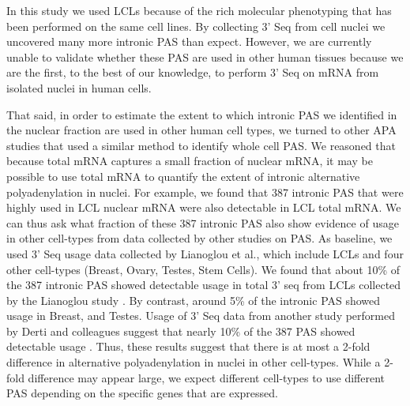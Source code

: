 In this study we used LCLs because of the rich molecular phenotyping that has been performed on the same cell lines. By collecting 3' Seq from cell nuclei we uncovered many more intronic PAS than expect. However, we are currently unable to validate whether these PAS are used in other human tissues because we are the first, to the best of our knowledge, to perform 3' Seq on mRNA from isolated nuclei in human cells.

That said, in order to estimate the extent to which intronic PAS we identified in the nuclear fraction are used in other human cell types, we turned to other APA studies that used a similar method to identify whole cell PAS. We reasoned that because total mRNA captures a small fraction of nuclear mRNA, it may be possible to use total mRNA to quantify the extent of intronic alternative polyadenylation in nuclei. For example, we found that 387 intronic PAS that were highly used in LCL nuclear mRNA were also detectable in LCL total mRNA. We can thus ask what fraction of these 387 intronic PAS also show evidence of usage in other cell-types from data collected by other studies on PAS. As baseline, we used 3' Seq usage data collected by Lianoglou et al., which include LCLs and four other cell-types (Breast, Ovary, Testes, Stem Cells). We found that about 10\% of the 387 intronic PAS showed detectable usage in total 3' seq from LCLs collected by the Lianoglou study \citep{lianoglou_ubiquitously_2013}. By contrast, around 5\% of the intronic PAS showed usage in Breast, and Testes. Usage of 3' Seq data from another study performed by Derti and colleagues suggest that nearly 10\% of the 387 PAS showed detectable usage \citep{derti_quantitative_2012}. Thus, these results suggest that there is at most a 2-fold difference in alternative polyadenylation in nuclei in other cell-types. While a 2-fold difference may appear large, we expect different cell-types to use different PAS depending on the specific genes that are expressed. 

